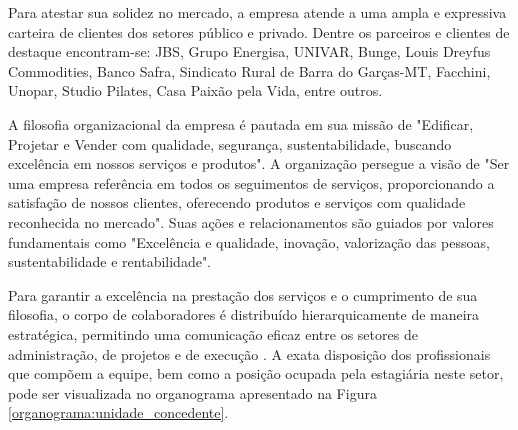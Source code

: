 Para atestar sua solidez no mercado, a empresa atende a uma ampla e expressiva carteira de clientes dos setores público e privado. Dentre os parceiros e clientes de destaque encontram-se: JBS, Grupo Energisa, UNIVAR, Bunge, Louis Dreyfus Commodities, Banco Safra, Sindicato Rural de Barra do Garças-MT, Facchini, Unopar, Studio Pilates, Casa Paixão pela Vida, entre outros. 

A filosofia organizacional da empresa é pautada em sua missão de "Edificar, Projetar e Vender com qualidade, segurança, sustentabilidade, buscando excelência em nossos serviços e produtos". A organização persegue a visão de "Ser uma empresa referência em todos os seguimentos de serviços, proporcionando a satisfação de nossos clientes, oferecendo produtos e serviços com qualidade reconhecida no mercado". Suas ações e relacionamentos são guiados por valores fundamentais como "Excelência e qualidade, inovação, valorização das pessoas, sustentabilidade e rentabilidade". 

Para garantir a excelência na prestação dos serviços e o cumprimento de sua filosofia, o corpo de colaboradores é distribuído hierarquicamente de maneira estratégica, permitindo uma comunicação eficaz entre os setores de administração, de projetos e de execução . A exata disposição dos profissionais que compõem a equipe, bem como a posição ocupada pela estagiária neste setor, pode ser visualizada no organograma apresentado na Figura \ref{organograma:unidade_concedente}.

